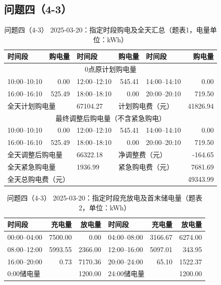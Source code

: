 \FloatBarrier
\clearpage
\subsection{问题四（4-3）}
\begin{table}[H]
\centering\footnotesize
\setlength{\tabcolsep}{4pt}
\caption{问题四（4-3） 2025-03-20：指定时段购电及全天汇总（题表1，电量单位：kWh）}
\label{tab:required-q43-2025-03-20-grid}
\begin{tabular}{@{}lrlrlr@{}}
\toprule
时间段 & 购电量 & 时间段 & 购电量 & 时间段 & 购电量 \\
\midrule
\multicolumn{6}{c}{0点原计划购电量} \\
10:00--10:10 & 0.00 & 12:00--12:10 & 545.41 & 14:00--14:10 & 0.00 \\
16:00--16:10 & 525.49 & 18:00--18:10 & 0.00 & 20:00--20:10 & 719.50 \\
\multicolumn{2}{l}{全天计划购电量} & 67104.27 & \multicolumn{2}{l}{计划购电费（元）} & 41826.94 \\
\multicolumn{6}{c}{最终调整后购电量（不含紧急购电）} \\
10:00--10:10 & 0.00 & 12:00--12:10 & 545.41 & 14:00--14:10 & 0.00 \\
16:00--16:10 & 525.49 & 18:00--18:10 & 0.00 & 20:00--20:10 & 719.50 \\
\multicolumn{2}{l}{全天调整后购电量} & 66322.18 & \multicolumn{2}{l}{净调整费（元）} & -164.65 \\
\multicolumn{2}{l}{全天紧急购电量} & 1936.99 & \multicolumn{2}{l}{紧急购电费（元）} & 7681.69 \\
\multicolumn{5}{l}{全天总购电费（元）} & 49343.99 \\
\bottomrule
\end{tabular}
\end{table}

\begin{table}[H]
\centering\footnotesize
\setlength{\tabcolsep}{4pt}
\caption{问题四（4-3） 2025-03-20：指定时段充放电及首末储电量（题表2，单位：kWh）}
\label{tab:required-q43-2025-03-20-storage}
\begin{tabular}{@{}lrrlrr@{}}
\toprule
时间段 & 充电量 & 放电量 & 时间段 & 充电量 & 放电量 \\
\midrule
00:00--04:00 & 7500.00 & 0.00 & 04:00--08:00 & 3166.67 & 6274.00 \\
08:00--12:00 & 5993.55 & 2366.00 & 12:00--16:00 & 5097.01 & 343.95 \\
16:00--20:00 & 0.73 & 7170.36 & 20:00--24:00 & 65.10 & 1522.37 \\
\multicolumn{2}{l}{0:00储电量} & 1200.00 & \multicolumn{2}{l}{24:00储电量} & 1200.00 \\
\bottomrule
\end{tabular}
\end{table}

